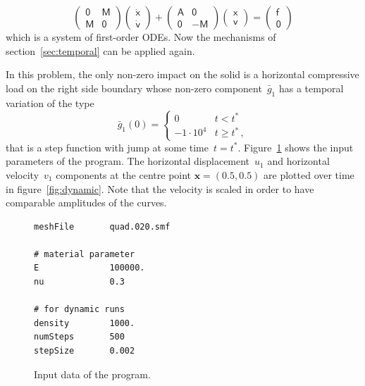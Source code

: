 \documentclass[a4paper,DIV=12,10pt]{scrartcl}
\newcommand{\vek}[1]{\boldsymbol{#1}}  %
\newcommand{\mat}[1]{\mathsf{#1}}      %
\newcommand{\x}[0]{\vek{x}}
\begin{document}
\begin{equation}
  \label{eq:block}
  \begin{pmatrix}
    \mat{0} &\mat{M} \\ \mat{M} &\mat{0} 
  \end{pmatrix}
  \begin{pmatrix}
    \dot{\mat{x}} \\ \dot{\mat{v}} 
  \end{pmatrix} +
  \begin{pmatrix}
    \mat{A} &\mat{0} \\ \mat{0} &-\mat{M} 
  \end{pmatrix}
  \begin{pmatrix}
    \mat{x} \\ \mat{v} 
  \end{pmatrix} =
  \begin{pmatrix}
    \mat{f}  \\ \mat{0} 
  \end{pmatrix} 
\end{equation}
which is a system of first-order ODEs. Now the mechanisms of
section~\ref{sec:temporal} can be applied again.

In this problem, the only non-zero impact on the solid is a horizontal
compressive load on the right side boundary whose non-zero
component~$\bar{g}_1$ has a temporal variation of the type
\begin{equation}
  \label{eq:traction}
  \bar{g}_1(0) = \left\{ 
    \begin{matrix} 
       0 &t < t^* \\
      -1 \cdot 10^4 &t \geq t^* \,,
    \end{matrix}
    \right. 
\end{equation}
that is a step function with jump at some time~$t = t^*$.
Figure~\ref{fig:inp2b} shows the input parameters of the program.
The horizontal displacement~$u_1$ and horizontal velocity~$v_1$
components at the centre point $\x = (0.5,0.5)$ are plotted over time
in figure~\ref{fig:dynamic}. Note that the velocity is scaled in order
to have comparable amplitudes of the curves.

\begin{figure}[htbp]
  \centering
  \begin{verbatim}
meshFile       quad.020.smf

# material parameter
E              100000.
nu             0.3

# for dynamic runs
density        1000.
numSteps       500
stepSize       0.002
  \end{verbatim}
  \caption{Input data of the program.}
  \label{fig:inp2b}
\end{figure}
\end{document}
